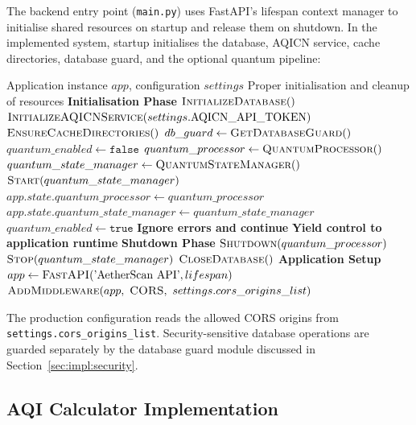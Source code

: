 \documentclass[12pt,a4paper]{article}
\begin{document}
The backend entry point (\texttt{main.py}) uses FastAPI's lifespan context
manager to initialise shared resources on startup and release them on
shutdown. In the implemented system, startup initialises the database, AQICN
service, cache directories, database guard, and the optional quantum pipeline:

\begin{algorithm}[H]
\caption{FastAPI Startup and Resource Initialisation}
\label{alg:lifespan}
\begin{algorithmic}[1]
\Require Application instance $\mathit{app}$, configuration $\mathit{settings}$
\Ensure Proper initialisation and cleanup of resources
\State \textbf{Initialisation Phase}
\State $\textsc{InitializeDatabase}()$
    \State $\textsc{InitializeAQICNService}(settings.\text{AQICN\_API\_TOKEN})$
\EndIf
\State $\textsc{EnsureCacheDirectories}()$
\State $db\_guard \leftarrow \textsc{GetDatabaseGuard}()$
\State $quantum\_enabled \leftarrow \texttt{false}$
\Try
    \State $quantum\_processor \leftarrow \textsc{QuantumProcessor}()$
    \State $quantum\_state\_manager \leftarrow \textsc{QuantumStateManager}()$
    \State $\textsc{Start}(quantum\_state\_manager)$
    \State $app.state.quantum\_processor \leftarrow quantum\_processor$
    \State $app.state.quantum\_state\_manager \leftarrow quantum\_state\_manager$
    \State $quantum\_enabled \leftarrow \texttt{true}$
\Catch
    \State \textbf{Ignore errors and continue}
\EndTry
\State \textbf{Yield control to application runtime}
\State \textbf{Shutdown Phase}
    \State $\textsc{Shutdown}(quantum\_processor)$
    \State $\textsc{Stop}(quantum\_state\_manager)$
\EndIf
\State $\textsc{CloseDatabase}()$
\State \textbf{Application Setup}
\State $app \leftarrow \textsc{FastAPI}(\text{'AetherScan API'}, lifespan)$
\State $\textsc{AddMiddleware}(app,\ \textsc{CORS},\ settings.cors\_origins\_list)$
\end{algorithmic}
\end{algorithm}

The production configuration reads the allowed CORS origins from
\texttt{settings.cors\_origins\_list}. Security-sensitive database operations
are guarded separately by the database guard module discussed in
Section~\ref{sec:impl:security}.

\subsection{AQI Calculator Implementation}
\label{sec:impl:aqi}
\end{document}
